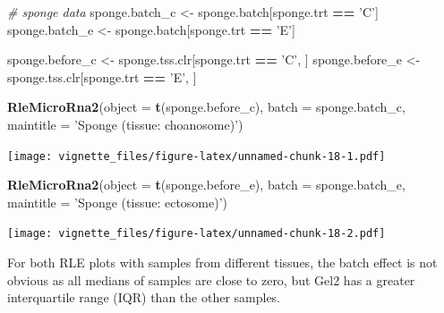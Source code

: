 \documentclass[]{book}
\newenvironment{Shaded}{\begin{snugshade}}{\end{snugshade}}
\newcommand{\KeywordTok}[1]{\textcolor[rgb]{0.13,0.29,0.53}{\textbf{#1}}}
\newcommand{\DataTypeTok}[1]{\textcolor[rgb]{0.13,0.29,0.53}{#1}}
\newcommand{\StringTok}[1]{\textcolor[rgb]{0.31,0.60,0.02}{#1}}
\newcommand{\CommentTok}[1]{\textcolor[rgb]{0.56,0.35,0.01}{\textit{#1}}}
\newcommand{\OperatorTok}[1]{\textcolor[rgb]{0.81,0.36,0.00}{\textbf{#1}}}
\newcommand{\NormalTok}[1]{#1}
\begin{document}
\begin{Shaded}
\begin{Highlighting}[]
\CommentTok{# sponge data}
\NormalTok{sponge.batch_c <-}\StringTok{ }\NormalTok{sponge.batch[sponge.trt }\OperatorTok{==}\StringTok{ 'C'}\NormalTok{]}
\NormalTok{sponge.batch_e <-}\StringTok{ }\NormalTok{sponge.batch[sponge.trt }\OperatorTok{==}\StringTok{ 'E'}\NormalTok{] }

\NormalTok{sponge.before_c <-}\StringTok{ }\NormalTok{sponge.tss.clr[sponge.trt }\OperatorTok{==}\StringTok{ 'C'}\NormalTok{, ]}
\NormalTok{sponge.before_e <-}\StringTok{ }\NormalTok{sponge.tss.clr[sponge.trt }\OperatorTok{==}\StringTok{ 'E'}\NormalTok{, ] }


\KeywordTok{RleMicroRna2}\NormalTok{(}\DataTypeTok{object =} \KeywordTok{t}\NormalTok{(sponge.before_c), }\DataTypeTok{batch =}\NormalTok{ sponge.batch_c, }
             \DataTypeTok{maintitle =} \StringTok{'Sponge (tissue: choanosome)'}\NormalTok{)}
\end{Highlighting}
\end{Shaded}

\texttt{[image: vignette\_files/figure-latex/unnamed-chunk-18-1.pdf]}

\begin{Shaded}
\begin{Highlighting}[]
\KeywordTok{RleMicroRna2}\NormalTok{(}\DataTypeTok{object =} \KeywordTok{t}\NormalTok{(sponge.before_e), }\DataTypeTok{batch =}\NormalTok{ sponge.batch_e, }
             \DataTypeTok{maintitle =} \StringTok{'Sponge (tissue: ectosome)'}\NormalTok{)}
\end{Highlighting}
\end{Shaded}

\texttt{[image: vignette\_files/figure-latex/unnamed-chunk-18-2.pdf]}

For both RLE plots with samples from different tissues, the batch effect
is not obvious as all medians of samples are close to zero, but Gel2 has
a greater interquartile range (IQR) than the other samples.
\end{document}
